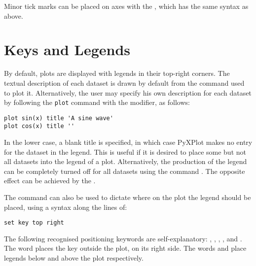 
Minor tick marks can be placed on axes with the , which has
the same syntax as above.

\section{Keys and Legends}

By default, plots are displayed with legends in their top-right corners. The
textual description of each dataset is drawn by default from the command used
to plot it. Alternatively, the user may specify his own description for each
dataset by following the {\tt plot} command with the  modifier,
as follows:

\begin{verbatim}
plot sin(x) title 'A sine wave'
plot cos(x) title ''
\end{verbatim}

In the lower case, a blank title is specified, in which case PyXPlot makes no
entry for the dataset in the legend. This is useful if it is desired to place
some but not all datasets into the legend of a plot.  Alternatively, the
production of the legend can be completely turned off for all datasets using
the command . The opposite effect can be achieved by the
.

The  command can also be used to dictate where on the plot the
legend should be placed, using a syntax along the lines of:

\begin{verbatim}
set key top right
\end{verbatim}

The following recognised positioning keywords are self-explanatory:
, , , ,
 and . The word  places the
key outside the plot, on its right side. The words  and
 place legends below and above the plot respectively.

